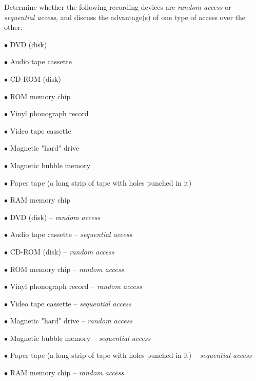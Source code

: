 

Determine whether the following recording devices are {\it random access} or {\it sequential access}, and discuss the advantage(s) of one type of access over the other:

\medskip
\item{$\bullet$} DVD (disk)
\item{$\bullet$} Audio tape cassette
\item{$\bullet$} CD-ROM (disk)
\item{$\bullet$} ROM memory chip
\item{$\bullet$} Vinyl phonograph record
\item{$\bullet$} Video tape cassette
\item{$\bullet$} Magnetic "hard" drive
\item{$\bullet$} Magnetic bubble memory
\item{$\bullet$} Paper tape (a long strip of tape with holes punched in it)
\item{$\bullet$} RAM memory chip 
\medskip







\medskip
\item{$\bullet$} DVD (disk) -- {\it random access}
\item{$\bullet$} Audio tape cassette -- {\it sequential access}
\item{$\bullet$} CD-ROM (disk) -- {\it random access}
\item{$\bullet$} ROM memory chip -- {\it random access}
\item{$\bullet$} Vinyl phonograph record -- {\it random access}
\item{$\bullet$} Video tape cassette -- {\it sequential access}
\item{$\bullet$} Magnetic "hard" drive -- {\it random access}
\item{$\bullet$} Magnetic bubble memory -- {\it sequential access}
\item{$\bullet$} Paper tape (a long strip of tape with holes punched in it) -- {\it sequential access}
\item{$\bullet$} RAM memory chip -- {\it random access}
\medskip


